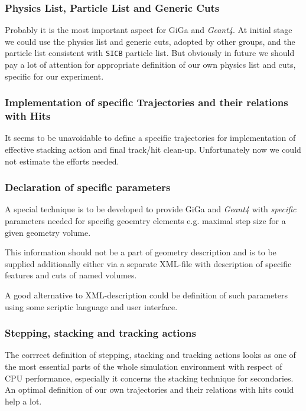 \documentclass[nfss,times,12pt,a4paper]{article}
\begin{document}
  \subsubsection{ Physics List, Particle List and Generic Cuts } 

Probably it is the most important aspect for {\sc GiGa} and {\it Geant4}. 
At initial stage we could use the physics list and generic cuts, 
adopted by other groups, and the particle list consistent with 
{\tt SICB} particle list.  But obviously in future we should 
pay a lot of attention for appropriate definition of our own 
physics list and cuts, specific for our experiment. 

  \subsubsection{ Implementation of specific Trajectories and their relations with Hits } 

It seems to be unavoidable to define a specific trajectories
for implementation of effective stacking action and final 
track/hit clean-up. Unfortunately now we could not estimate 
the efforts needed. 

  \subsubsection{ Declaration of specific parameters         } 

A special technique  is to be developed to provide {\sc GiGa} and {\it Geant4} 
with {\it specific} parameters needed for specifig geoemtry elements
e.g. maximal step size for a given geometry volume. 

This information should not be a part of geometry description and is to be supplied 
additionally either via a separate XML-file with description of specific features 
and cuts of named volumes.
 
A good alternative to XML-description could be definition of such parameters 
using some scriptic language and user interface.


  \subsubsection{ Stepping, stacking and tracking actions    } 

The corrrect definition of stepping, stacking and tracking actions 
looks as one of the most essential parts of the whole simulation environment 
with respect of CPU performance, especially it concerns the 
stacking technique for secondaries. An optimal definition of 
our own trajectories and their relations with hits could help a lot. 
\end{document}
